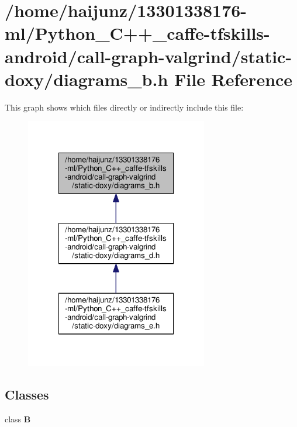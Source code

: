 \section{/home/haijunz/13301338176-\/ml/\-Python\-\_\-\-C++\-\_\-caffe-\/tfskills-\/android/call-\/graph-\/valgrind/static-\/doxy/diagrams\-\_\-b.h File Reference}
\label{diagrams__b_8h}
This graph shows which files directly or indirectly include this file\-:\nopagebreak
\begin{figure}[H]
\begin{center}
\leavevmode
\includegraphics[width=226pt]{diagrams__b_8h__dep__incl}
\end{center}
\end{figure}
\subsection*{Classes}
\begin{DoxyCompactItemize}
\item 
class {\bf B}
\end{DoxyCompactItemize}
